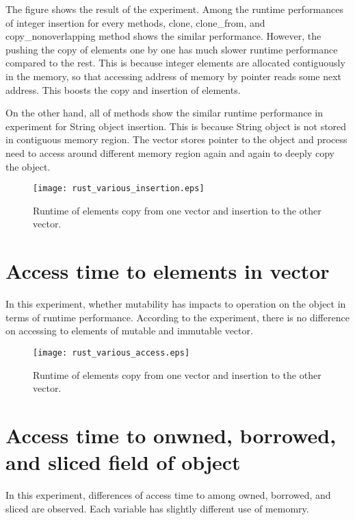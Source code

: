 The figure shows the result of the experiment. Among the runtime performances of integer insertion for every methods, 
clone, clone_from, and copy_nonoverlapping method shows the similar performance. However, the pushing the copy of elements one by one has much slower runtime performance 
compared to the rest. This is because integer elements are allocated contiguously in the memory, so that accessing address of memory by pointer reads some next address. 
This boosts the copy and insertion of elements. 

On the other hand, all of methods show the similar runtime performance in experiment for String object insertion. 
This is because String object is not stored in contiguous memory region. The vector stores pointer to the object and 
process need to access around different memory region again and again to deeply copy the object.

\begin{figure}[htb]
    \texttt{[image: rust\_various\_insertion.eps]}
    \caption{Runtime of elements copy from one vector and insertion to the other vector.}
    \label{fig:Sampling}
\end{figure}



\section{Access time to elements in vector}
\label{sec:history}
In this experiment, whether mutability has impacts to operation on the object in terms of runtime performance. 
According to the experiment, there is no difference on accessing to elements of mutable and immutable vector.

\begin{figure}[htb]
    \texttt{[image: rust\_various\_access.eps]}
    \caption{Runtime of elements copy from one vector and insertion to the other vector.}
    \label{fig:Sampling}
\end{figure}

\section{Access time to onwned, borrowed, and sliced field of object}
\label{sec:history}
In this experiment, differences of access time to among owned, borrowed, and sliced are observed. 
Each variable has slightly different use of memomry. 


